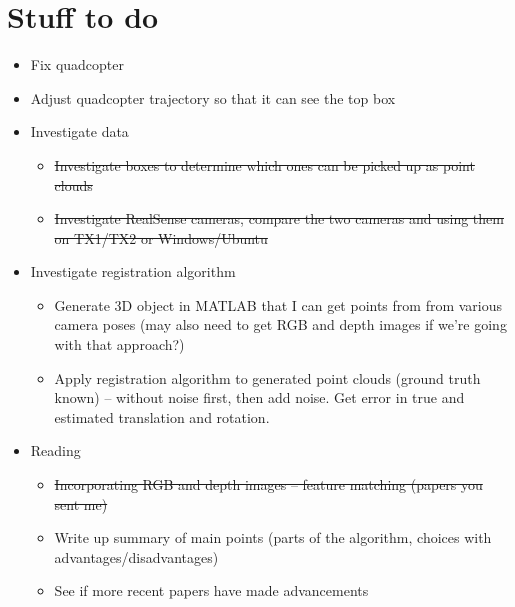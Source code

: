 \documentclass[12pt,a4paper]{article}
\begin{document}
\section{Stuff to do}
\begin{itemize}
\item Fix quadcopter
\item Adjust quadcopter trajectory so that it can see the top box
\item Investigate data
\begin{itemize}
\item \sout{Investigate boxes to determine which ones can be picked up as point clouds}
\item \sout{Investigate RealSense cameras, compare the two cameras and using them on TX1/TX2 or Windows/Ubuntu}
\end{itemize}
\item Investigate registration algorithm
\begin{itemize}
\item Generate 3D object in MATLAB that I can get points from from various camera poses (may also need to get RGB and depth images if we're going with that approach?)
\item Apply registration algorithm to generated point clouds (ground truth known) -- without noise first, then add noise. Get error in true and estimated translation and rotation.
\end{itemize}
\item Reading
\begin{itemize}
\item \sout{Incorporating RGB and depth images -- feature matching (papers you sent me)}
\item Write up summary of main points (parts of the algorithm, choices with advantages/disadvantages)
\item See if more recent papers have made advancements
\end{itemize}
\end{itemize}
\end{document}
